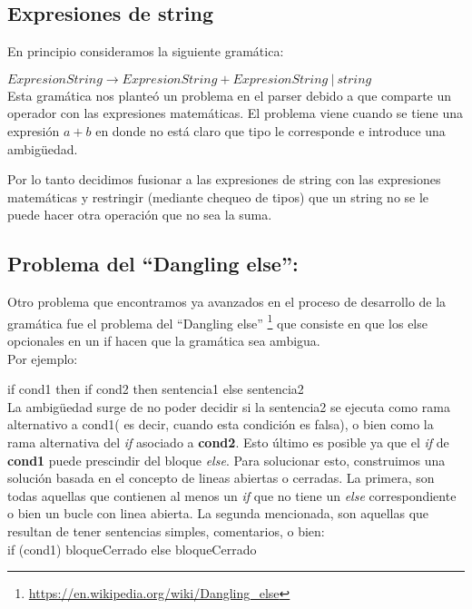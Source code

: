\subsection{Expresiones de string}
En principio consideramos la siguiente gramática:

$ExpresionString \rightarrow ExpresionString + ExpresionString \ | \ string$ \\

Esta gramática nos planteó un problema en el parser debido a que comparte un operador con las expresiones matemáticas. El problema viene cuando se tiene una expresión $a+b$ en donde no está claro que tipo le corresponde e introduce una ambigüedad.

Por lo tanto decidimos fusionar a las expresiones de string con las expresiones matemáticas y restringir (mediante chequeo de tipos) que un string no se le puede hacer otra operación que no sea la suma.

\subsection{Problema del ``Dangling else'':}

Otro problema que encontramos ya avanzados en el proceso de desarrollo de la gramática fue el problema del ``Dangling else'' \footnote{\url{https://en.wikipedia.org/wiki/Dangling_else}} que consiste en que los else opcionales en un if hacen que la gramática sea ambigua. 
\\
Por ejemplo: 

if cond1 then if cond2 then sentencia1 else sentencia2 \\

La ambigüedad surge de no poder decidir si la sentencia2 se ejecuta como rama alternativo a cond1( es decir, cuando esta condición es falsa), o bien como la rama alternativa del \textit{if} asociado a \textbf{cond2}. Esto último es posible ya que el \textit{if} de \textbf{cond1} puede prescindir del bloque \textit{else}.
Para solucionar esto, construimos una solución basada en el concepto de lineas abiertas o cerradas. La primera, son todas aquellas que contienen al menos un \textit{if} que no tiene un \textit{else} correspondiente o bien un bucle con linea abierta. La segunda mencionada, son aquellas que resultan de tener sentencias simples, comentarios, o bien: \\

if (cond1) bloqueCerrado else bloqueCerrado \\

